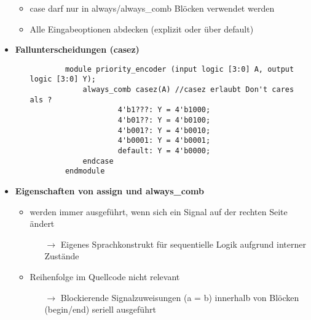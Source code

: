 \begin{itemize}
\begin{itemize}
	\item case darf nur in always/always\_comb Blöcken verwendet werden
	\item Alle Eingabeoptionen abdecken (explizit oder über default)
	\end{itemize}

\item \textbf{Fallunterscheidungen (casez)}
	\begin{itemize}
	\item[]
		\begin{lstlisting}
		module priority_encoder (input logic [3:0] A, output logic [3:0] Y);
			always_comb casez(A) //casez erlaubt Don't cares als ?
					4'b1???: Y = 4'b1000;
					4'b01??: Y = 4'b0100;
					4'b001?: Y = 4'b0010;
					4'b0001: Y = 4'b0001;
					default: Y = 4'b0000;
			endcase
		endmodule
		\end{lstlisting}
	\end{itemize}

\item \textbf{Eigenschaften von assign und always\_comb}
	\begin{itemize}
	\item werden immer ausgeführt, wenn sich ein Signal auf der rechten Seite ändert
		\begin{itemize}
		\item[$\rightarrow$] Eigenes Sprachkonstrukt für sequentielle Logik aufgrund interner Zustände
		\end{itemize}
		
	\item Reihenfolge im Quellcode nicht relevant
		\begin{itemize}
		\item[$\rightarrow$] Blockierende Signalzuweisungen (a = b) innerhalb von Blöcken (begin/end) seriell ausgeführt
		\end{itemize}
	\end{itemize}

\end{itemize}


